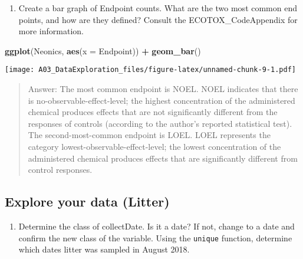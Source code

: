 \documentclass[]{article}
\newenvironment{Shaded}{\begin{snugshade}}{\end{snugshade}}
\newcommand{\CommentTok}[1]{\textcolor[rgb]{0.56,0.35,0.01}{\textit{#1}}}
\newcommand{\DataTypeTok}[1]{\textcolor[rgb]{0.13,0.29,0.53}{#1}}
\newcommand{\KeywordTok}[1]{\textcolor[rgb]{0.13,0.29,0.53}{\textbf{#1}}}
\newcommand{\NormalTok}[1]{#1}
\newcommand{\OperatorTok}[1]{\textcolor[rgb]{0.81,0.36,0.00}{\textbf{#1}}}
\newcommand{\StringTok}[1]{\textcolor[rgb]{0.31,0.60,0.02}{#1}}
\providecommand{\tightlist}{%
  \setlength{\itemsep}{0pt}\setlength{\parskip}{0pt}}
\begin{document}
\begin{enumerate}
\def\labelenumi{\arabic{enumi}.}
\setcounter{enumi}{10}
\tightlist
\item
  Create a bar graph of Endpoint counts. What are the two most common
  end points, and how are they defined? Consult the ECOTOX\_CodeAppendix
  for more information.
\end{enumerate}

\begin{Shaded}
\begin{Highlighting}[]
\KeywordTok{ggplot}\NormalTok{(Neonics, }\KeywordTok{aes}\NormalTok{(}\DataTypeTok{x =}\NormalTok{ Endpoint)) }\OperatorTok{+}\StringTok{ }\KeywordTok{geom_bar}\NormalTok{()}
\end{Highlighting}
\end{Shaded}

\texttt{[image: A03\_DataExploration\_files/figure-latex/unnamed-chunk-9-1.pdf]}

\begin{quote}
Answer: The most common endpoint is NOEL. NOEL indicates that there is
no-observable-effect-level; the highest concentration of the
administered chemical produces effects that are not significantly
different from the responses of controls (according to the author's
reported statistical test). The second-most-common endpoint is LOEL.
LOEL represents the category lowest-observable-effect-level; the lowest
concentration of the administered chemical produces effects that are
significantly different from control responses.
\end{quote}

\hypertarget{explore-your-data-litter}{%
\subsection{Explore your data (Litter)}\label{explore-your-data-litter}}

\begin{enumerate}
\def\labelenumi{\arabic{enumi}.}
\setcounter{enumi}{11}
\tightlist
\item
  Determine the class of collectDate. Is it a date? If not, change to a
  date and confirm the new class of the variable. Using the
  \texttt{unique} function, determine which dates litter was sampled in
  August 2018.
\end{enumerate}

\begin{Shaded}
\end{Shaded}
\end{document}
